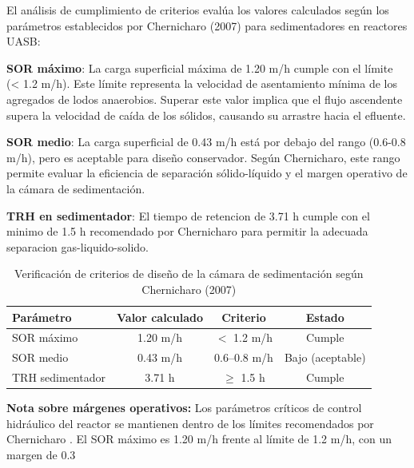 \documentclass[12pt,a4paper]{article}
\begin{document}
El análisis de cumplimiento de criterios evalúa los valores calculados según los parámetros establecidos por Chernicharo (2007) para sedimentadores en reactores UASB:


     \textbf{SOR máximo}: La carga superficial máxima de 1.20 m/h cumple con el límite (< 1.2 m/h). Este límite representa la velocidad de asentamiento mínima de los agregados de lodos anaerobios. Superar este valor implica que el flujo ascendente supera la velocidad de caída de los sólidos, causando su arrastre hacia el efluente.
    
     \textbf{SOR medio}: La carga superficial de 0.43 m/h está por debajo del rango (0.6-0.8 m/h), pero es aceptable para diseño conservador. Según Chernicharo, este rango permite evaluar la eficiencia de separación sólido-líquido y el margen operativo de la cámara de sedimentación.
    
     \textbf{TRH en sedimentador}: El tiempo de retencion de 3.71 h cumple con el minimo de 1.5 h recomendado por Chernicharo para permitir la adecuada separacion gas-liquido-solido.


\begin{table}[H]
\centering
\caption{Verificación de criterios de diseño de la cámara de sedimentación según Chernicharo (2007)}
\begin{tabular}{lccc}
\toprule
\textbf{Parámetro} & \textbf{Valor calculado} & \textbf{Criterio} & \textbf{Estado} \\
\midrule
SOR máximo & 1.20 m/h & $<$ 1.2 m/h & Cumple \\
SOR medio & 0.43 m/h & 0.6--0.8 m/h & Bajo (aceptable) \\
TRH sedimentador & 3.71 h & $\geq$ 1.5 h & Cumple \\
\bottomrule
\end{tabular}
\end{table}

\textbf{Nota sobre márgenes operativos:} Los parámetros críticos de control hidráulico del reactor se mantienen dentro de los límites recomendados por Chernicharo \cite{chernicharo2007}. El SOR máximo es 1.20 m/h frente al límite de 1.2 m/h, con un margen de 0.3%
\end{document}
